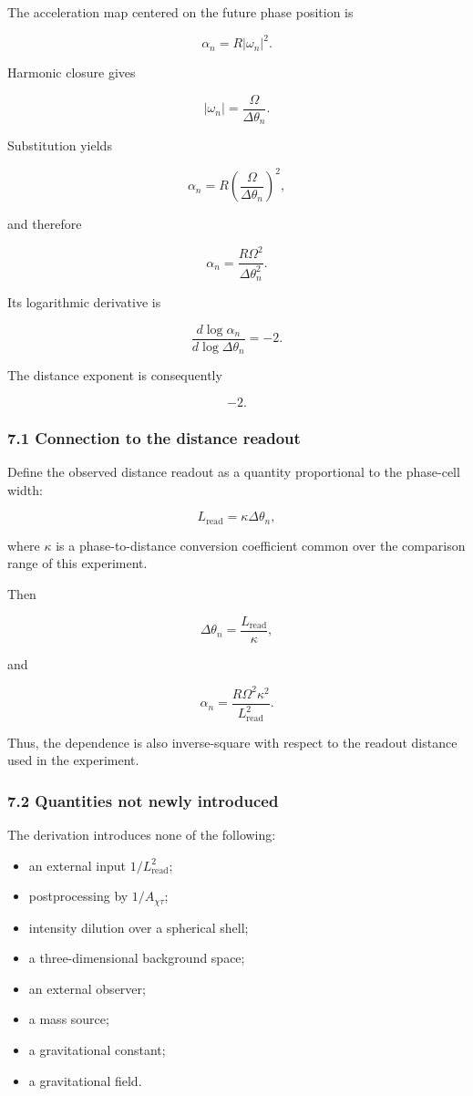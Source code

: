 \documentclass[
  a4paper,
]{article}
\newcounter{none} %
\providecommand{\tightlist}{%
  \setlength{\itemsep}{0pt}\setlength{\parskip}{0pt}}
\begin{document}
The acceleration map centered on the future phase position is

\[
\alpha_n=R|\omega_n|^2.
\]

Harmonic closure gives

\[
|\omega_n|
=\frac{\Omega}{\Delta\theta_n}.
\]

Substitution yields

\[
\alpha_n
=R\left(\frac{\Omega}{\Delta\theta_n}\right)^2,
\]

and therefore

\[
\boxed{
\alpha_n
=\frac{R\Omega^2}{\Delta\theta_n^2}
}.
\]

Its logarithmic derivative is

\[
\frac{d\log\alpha_n}
{d\log\Delta\theta_n}
=-2.
\]

The distance exponent is consequently

\[
\boxed{-2}.
\]

\subsubsection{7.1 Connection to the distance
readout}\label{connection-to-the-distance-readout}

Define the observed distance readout as a quantity proportional to the
phase-cell width:

\[
L_{\mathrm{read}}
=\kappa\Delta\theta_n,
\]

where \(\kappa\) is a phase-to-distance conversion coefficient common
over the comparison range of this experiment.

Then

\[
\Delta\theta_n
=\frac{L_{\mathrm{read}}}{\kappa},
\]

and

\[
\boxed{
\alpha_n
=\frac{R\Omega^2\kappa^2}
{L_{\mathrm{read}}^2}
}.
\]

Thus, the dependence is also inverse-square with respect to the readout
distance used in the experiment.

\subsubsection{7.2 Quantities not newly
introduced}\label{quantities-not-newly-introduced}

The derivation introduces none of the following:

\begin{itemize}
\tightlist
\item
  an external input \(1/L_{\mathrm{read}}^2\);
\item
  postprocessing by \(1/A_{\chi\tau}\);
\item
  intensity dilution over a spherical shell;
\item
  a three-dimensional background space;
\item
  an external observer;
\item
  a mass source;
\item
  a gravitational constant;
\item
  a gravitational field.
\end{itemize}
\end{document}
